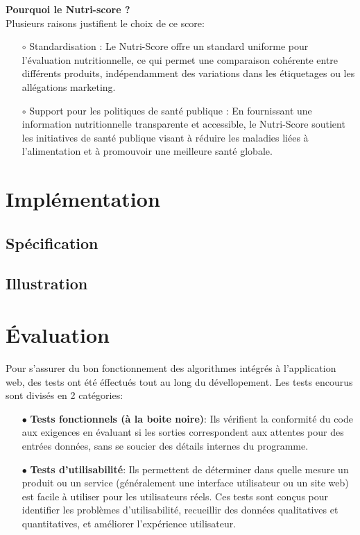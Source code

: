 \documentclass[11pt]{article}
\begin{document}
\textbf{Pourquoi le Nutri-score ?}\\

Plusieurs raisons justifient le choix de ce score:\\

\begin{itemize}

    \item[$\circ$] Standardisation : Le Nutri-Score offre un standard uniforme pour l'évaluation nutritionnelle, ce qui permet une comparaison cohérente entre différents produits, indépendamment des variations dans les étiquetages ou les allégations marketing.\\

    \item[$\circ$] Support pour les politiques de santé publique : En fournissant une information nutritionnelle transparente et accessible, le Nutri-Score soutient les initiatives de santé publique visant à réduire les maladies liées à l'alimentation et à promouvoir une meilleure santé globale.
\end{itemize}


\newpage
\section{Implémentation}
\label{implementation}
\subsection{Spécification}
\subsection{Illustration}

\newpage
\section{Évaluation}
Pour s'assurer du bon fonctionnement des algorithmes intégrés à l'application web, des tests ont été éffectués tout au long du dévellopement. Les tests encourus sont divisés en 2 catégories:\\

\begin{itemize}
	\item[$\bullet$] \textbf{Tests fonctionnels (à la boite noire)}: Ils vérifient la conformité du code aux exigences en évaluant si les sorties correspondent aux attentes pour des entrées données, sans se soucier des détails internes du programme.\\
	
	\item[$\bullet$] \textbf{Tests d'utilisabilité}: Ils permettent de déterminer dans quelle mesure un produit ou un service (généralement une interface utilisateur ou un site web) est facile à utiliser pour les utilisateurs réels. Ces tests sont conçus pour identifier les problèmes d'utilisabilité, recueillir des données qualitatives et quantitatives, et améliorer l'expérience utilisateur.\\
\end{itemize}
\end{document}

